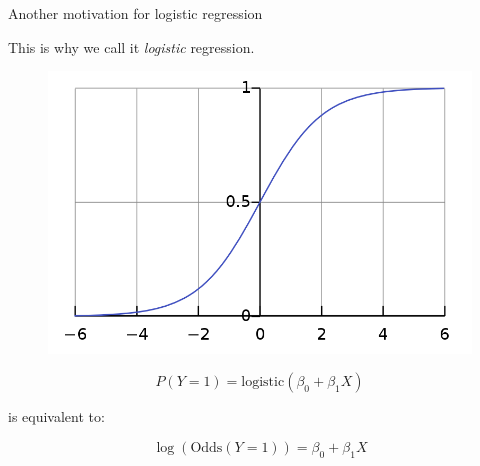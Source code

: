 \documentclass[10pt,t]{beamer}
\begin{document}
\begin{frame}{Another motivation for logistic regression}
	
	\vspace{-5 mm}
	
	This is why we call it \textit{logistic} regression.
\smallskip
	\begin{figure}
		\centering
		\includegraphics[scale = 0.15]{figs/logistic_curve}
	\end{figure}
\centering
	$$P(Y=1) = \text{logistic}(\beta_0+\beta_1 X)$$
	\medskip
	
	is equivalent to:
	\medskip
	
	$$\log(\text{Odds}(Y=1))=\beta_0+\beta_1 X$$
	
	


\end{frame}
\end{document}
